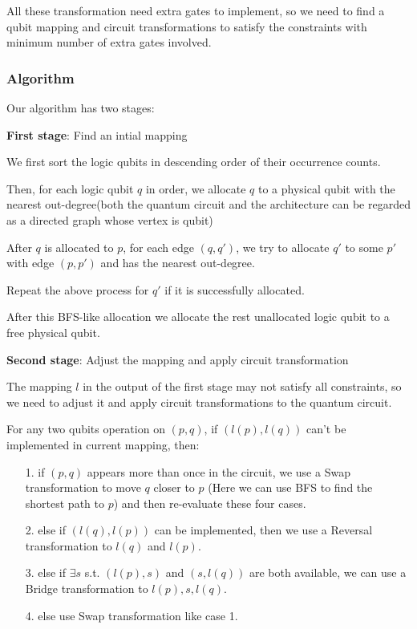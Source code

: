 All these transformation need extra gates to implement, so we need to find a qubit mapping and circuit transformations to satisfy the constraints with minimum number of extra gates involved.

\subsubsection{Algorithm}

Our algorithm has two stages:

\textbf{First stage}: Find an intial mapping

We first sort the logic qubits in descending order of their occurrence counts.

Then, for each logic qubit $q$ in order, we allocate $q$ to a physical qubit with the nearest out-degree(both the quantum circuit and the architecture can be regarded as a directed graph whose vertex is qubit)

After $q$ is allocated to $p$, for each edge $(q,q')$, we try to allocate $q'$ to some $p'$ with edge $(p,p')$ and has the nearest out-degree.

Repeat the above process for $q'$ if it is successfully allocated.

After this BFS-like allocation we allocate the rest unallocated logic qubit to a free physical qubit.

\textbf{Second stage}: Adjust the mapping and apply circuit transformation

The mapping $l$ in the output of the first stage may not satisfy all constraints, so we need to adjust it and apply circuit transformations to the quantum circuit.

For any two qubits operation on $(p,q)$, if $(l(p),l(q))$ can't be implemented in current mapping, then:
\begin{itemize}
    \item[1.] if $(p,q)$ appears more than once in the circuit, we use a Swap transformation to move $q$ closer to $p$ (Here we can use BFS to find the shortest path to $p$) and then re-evaluate these four cases.
    \item[2.] else if $(l(q), l(p))$ can be implemented, then we use a Reversal transformation to $l(q)$ and $l(p)$.
    \item[3.] else if $\exists s$ s.t. $(l(p),s)$ and $(s, l(q))$ are both available, we can use a Bridge transformation to $l(p), s, l(q)$.
    \item[4.] else use Swap transformation like case 1.
\end{itemize}
